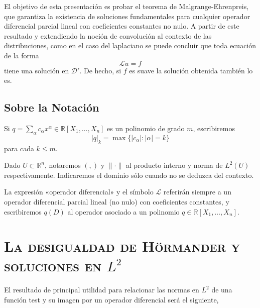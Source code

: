 \documentclass[11pt]{article}
\theoremstyle{colored}
\newcommand{\R}{\mathbb{R}}
\newcommand{\test}{\mathscr{D}}
\newcommand{\dist}{\test'}
\newcommand{\ip}[1]{( #1 )}
\newcommand{\guill}[1]{«#1»}
\renewcommand{\L}{\mathscr{L}}
\begin{document}
El objetivo de esta presentación es probar el teorema de Malgrange-Ehrenpreis, que garantiza la existencia de soluciones fundamentales para cualquier operador diferencial parcial lineal con coeficientes constantes no nulo. A partir de este resultado y extendiendo la noción de convolución al contexto de las distribuciones, como en el caso del laplaciano se puede concluir que toda ecuación de la forma
\[
\L u = f \tag{$1$}
\]
tiene una solución en $\dist$. De hecho, si $f$ es suave la solución obtenida también lo es. 
\subsection{Sobre la Notación}

Si $q = \sum_{\alpha}c_\alpha x^\alpha\in \R[X_1, \dots, X_n]$ es un polinomio de grado $m$, escribiremos
\[
|q|_k = \max\{|c_\alpha| : |\alpha| = k\}
\]
para cada $k \leq m$.

Dado $U \subset \R^n$, notaremos $\ip{,}$ y $\|\cdot\|$ al producto interno y norma de $L^2(U)$ respectivamente. Indicaremos el dominio sólo cuando no se deduzca del contexto. 

La expresión \guill{operador diferencial} y el símbolo $\L$ referirán siempre a un operador diferencial parcial lineal (no nulo) con coeficientes constantes, y escribiremos $q(D)$ al operador asociado a un polinomio $q \in \R[X_1, \dots, X_n]$. 

\section{\scshape La desigualdad de Hörmander y soluciones en $L^2$}

El resultado de principal utilidad para relacionar las normas en $L^2$ de una función test y su imagen por un operador diferencial será el siguiente,
\end{document}
